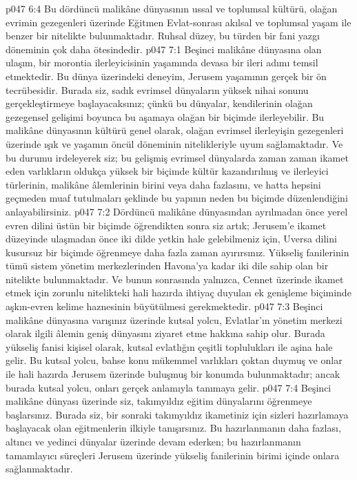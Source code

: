 \vs p047 6:4 Bu dördüncü malikâne dünyasının ussal ve toplumsal kültürü, olağan evrimin gezegenleri üzerinde Eğitmen Evlat\hyp{}sonrası akılsal ve toplumsal yaşam ile benzer bir nitelikte bulunmaktadır. Ruhsal düzey, bu türden bir fani yazgı döneminin çok daha ötesindedir.
\vs p047 7:1 Beşinci malikâne dünyasına olan ulaşım, bir morontia ilerleyicisinin yaşamında devasa bir ileri adımı temsil etmektedir. Bu dünya üzerindeki deneyim, Jerusem yaşamının gerçek bir ön tecrübesidir. Burada siz, sadık evrimsel dünyaların yüksek nihai sonunu gerçekleştirmeye başlayacaksınız; çünkü bu dünyalar, kendilerinin olağan gezegensel gelişimi boyunca bu aşamaya olağan bir biçimde ilerleyebilir. Bu malikâne dünyasının kültürü genel olarak, olağan evrimsel ilerleyişin gezegenleri üzerinde ışık ve yaşamın öncül döneminin nitelikleriyle uyum sağlamaktadır. Ve bu durumu irdeleyerek siz; bu gelişmiş evrimsel dünyalarda zaman zaman ikamet eden varlıkların oldukça yüksek bir biçimde kültür kazandırılmış ve ilerleyici türlerinin, malikâne âlemlerinin birini veya daha fazlasını, ve hatta hepsini geçmeden muaf tutulmaları şeklinde bu yapının neden bu biçimde düzenlendiğini anlayabilirsiniz.
\vs p047 7:2 Dördüncü malikâne dünyasından ayrılmadan önce yerel evren dilini üstün bir biçimde öğrendikten sonra siz artık; Jerusem’e ikamet düzeyinde ulaşmadan önce iki dilde yetkin hale gelebilmeniz için, Uversa dilini kusursuz bir biçimde öğrenmeye daha fazla zaman ayırırsınız. Yükseliş fanilerinin tümü sistem yönetim merkezlerinden Havona’ya kadar iki dile sahip olan bir nitelikte bulunmaktadır. Ve bunun sonrasında yalnızca, Cennet üzerinde ikamet etmek için zorunlu nitelikteki hali hazırda ihtiyaç duyulan ek genişleme biçiminde aşkın\hyp{}evren kelime haznesinin büyütülmesi gerekmektedir.
\vs p047 7:3 Beşinci malikâne dünyasına varışınız üzerinde kutsal yolcu, Evlatlar’ın yönetim merkezi olarak ilgili âlemin geniş dünyasını ziyaret etme hakkına sahip olur. Burada yükseliş fanisi kişisel olarak, kutsal evlatlığın çeşitli toplulukları ile aşina hale gelir. Bu kutsal yolcu, bahse konu mükemmel varlıkları çoktan duymuş ve onlar ile hali hazırda Jerusem üzerinde buluşmuş bir konumda bulunmaktadır; ancak burada kutsal yolcu, onları gerçek anlamıyla tanımaya gelir.
\vs p047 7:4 Beşinci malikâne dünyası üzerinde siz, takımyıldız eğitim dünyalarını öğrenmeye başlarsınız. Burada siz, bir sonraki takımyıldız ikametiniz için sizleri hazırlamaya başlayacak olan eğitmenlerin ilkiyle tanışırsınız. Bu hazırlanmanın daha fazlası, altıncı ve yedinci dünyalar üzerinde devam ederken; bu hazırlanmanın tamamlayıcı süreçleri Jerusem üzerinde yükseliş fanilerinin birimi içinde onlara sağlanmaktadır.
